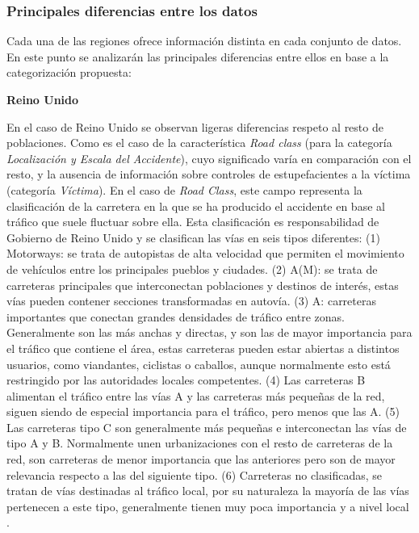 \subsubsection*{Principales diferencias entre los datos}

Cada una de las regiones ofrece información distinta en cada conjunto de datos. En este punto se analizarán las principales diferencias entre ellos en base a la categorización propuesta:

\textbf{Reino Unido}

En el caso de Reino Unido se observan ligeras diferencias respeto al resto de poblaciones. Como es el caso de la característica \textit{Road class} (para la categoría \textit{Localización y Escala del Accidente}), cuyo significado varía en comparación con el resto, y la ausencia de información sobre controles de estupefacientes a la víctima (categoría \textit{Víctima}). En el caso de \textit{Road Class}, este campo representa la clasificación de la carretera en la que se ha producido el accidente en base al tráfico que suele fluctuar sobre ella. Esta clasificación es responsabilidad de Gobierno de Reino Unido y se clasifican las vías en seis tipos diferentes: (1) Motorways: se trata de autopistas de alta velocidad que permiten el movimiento de vehículos entre los principales pueblos y ciudades. (2) A(M): se trata de carreteras principales que interconectan poblaciones y destinos de interés, estas vías pueden contener secciones transformadas en autovía. (3) A: carreteras importantes que conectan grandes densidades de tráfico entre zonas. Generalmente son las más anchas y directas, y son las de mayor importancia para el tráfico que contiene el área, estas carreteras pueden estar abiertas a distintos usuarios, como viandantes, ciclistas o caballos, aunque normalmente esto está restringido por las autoridades locales competentes. (4) Las carreteras B alimentan el tráfico entre las vías A y las carreteras más pequeñas de la red, siguen siendo de especial importancia para el tráfico, pero menos que las A. (5) Las carreteras tipo C son generalmente más pequeñas e interconectan las vías de tipo A y B. Normalmente unen urbanizaciones con el resto de carreteras de la red, son carreteras de menor importancia que las anteriores pero son de mayor relevancia respecto a las del siguiente tipo. (6) Carreteras no clasificadas, se tratan de vías destinadas al tráfico local, por su naturaleza la mayoría de las vías pertenecen a este tipo, generalmente tienen muy poca importancia y a nivel local \cite{UKDepartmentForTransportRoadClassification}.


